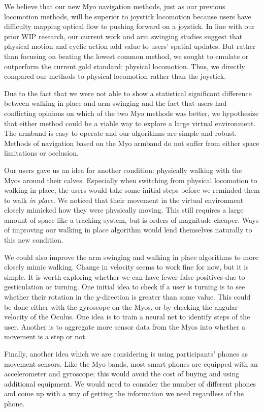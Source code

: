 \documentclass[titlepage]{article}
\theoremstyle{definition}
\theoremstyle{proof}
\begin{document}

We believe that our new Myo navigation methods, just as our previous locomotion methods,
will be superior to joystick locomotion because
users have difficulty mapping optical flow to pushing forward on a joystick.
In line with our prior WIP research,
our current work and arm swinging studies suggest that physical motion and cyclic action add
value to users' spatial updates.
But rather than focusing on beating the lowest common method,
we sought to emulate or outperform the current gold standard: physical locomotion.
Thus, we directly compared our methods to physical locomotion rather than the joystick.

Due to the fact that we were not able to show a statistical significant difference between
walking in place and arm swinging
and the fact that users had conflicting opinions on which of the two Myo methods was better,
we hypothesize that either method could be a viable way to explore a large virtual environment.
The armband is easy to operate and our algorithms are simple and robust.
Methods of navigation based on the Myo armband do not suffer from either space limitations or occlusion.

Our users gave us an idea for another condition:
physically walking with the Myos around their calves.
Especially when switching from physical locomotion to walking in place,
the users would take some initial steps before we reminded them to walk \emph{in place}.
We noticed that their movement in the virtual environment closely mimicked
how they were physically moving.
This still requires a large amount of space like a tracking system,
but is orders of magnitude cheaper.
Ways of improving our walking in place algorithm would lend themselves naturally to this new condition.


We could also improve the arm swinging and walking in place algorithms to more closely mimic walking.
Change in velocity seems to work fine for now,
but it is simple.
It is worth exploring whether we can have fewer false positives due to gesticulation or turning.
One initial idea to check if a user is turning is to see whether
their rotation in the $y$-direction is greater than some value.
This could be done either with the gyroscope on the Myos,
or by checking the angular velocity of the Oculus.
One idea is to train a neural net to identify steps of the user.
Another is to aggregate more sensor data from the Myos into whether a movement is a step or not.

Finally, another idea which we are considering is using participants' phones as movement sensors.
Like the Myo bands, most smart phones are equipped with an accelerometer and gyroscope;
this would avoid the cost of buying and using additional equipment.
We would need to consider the number of different phones
and come up with a way of getting the information we need regardless of the phone.
\end{document}
